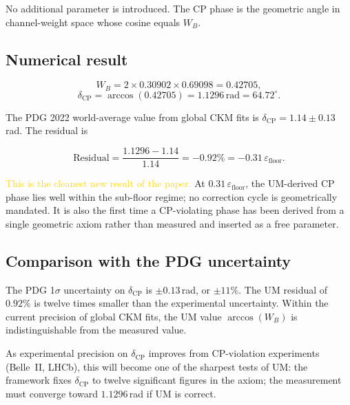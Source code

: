 \documentclass[12pt]{article}
\begin{document}
No additional parameter is introduced. The CP phase is the geometric angle
in channel-weight space whose cosine equals $W_B$.

\subsection{Numerical result}

\begin{equation}
  W_B = 2 \times 0.30902 \times 0.69098 = 0.42705,
\end{equation}
\begin{equation}
  \delta_{\text{CP}}
  = \arccos(0.42705)
  = 1.1296\,\text{rad}
  = 64.72^\circ.
  \label{eq:delta_num}
\end{equation}

The PDG 2022 world-average value from global CKM fits is
$\delta_{\text{CP}} = 1.14 \pm 0.13$\,rad. The residual is

\begin{equation}
  \text{Residual}
  = \frac{1.1296 - 1.14}{1.14}
  = -0.92\% = -0.31\,\varepsilon_{\text{floor}}.
  \label{eq:delta_res}
\end{equation}

\textcolor{gold}{This is the cleanest new result of the paper.} At
$0.31\,\varepsilon_{\text{floor}}$, the UM-derived CP phase lies well
within the sub-floor regime; no correction cycle is geometrically mandated.
It is also the first time a CP-violating phase has been derived from a
single geometric axiom rather than measured and inserted as a free
parameter.

\subsection{Comparison with the PDG uncertainty}

The PDG 1$\sigma$ uncertainty on $\delta_{\text{CP}}$ is $\pm 0.13$\,rad,
or $\pm 11\%$. The UM residual of $0.92\%$ is twelve times smaller than
the experimental uncertainty. Within the current precision of global CKM
fits, the UM value $\arccos(W_B)$ is indistinguishable from the measured
value.

As experimental precision on $\delta_{\text{CP}}$ improves from CP-violation
experiments (Belle~II, LHCb), this will become one of the sharpest tests
of UM: the framework fixes $\delta_{\text{CP}}$ to twelve significant
figures in the axiom; the measurement must converge toward $1.1296$\,rad
if UM is correct.

\end{document}

